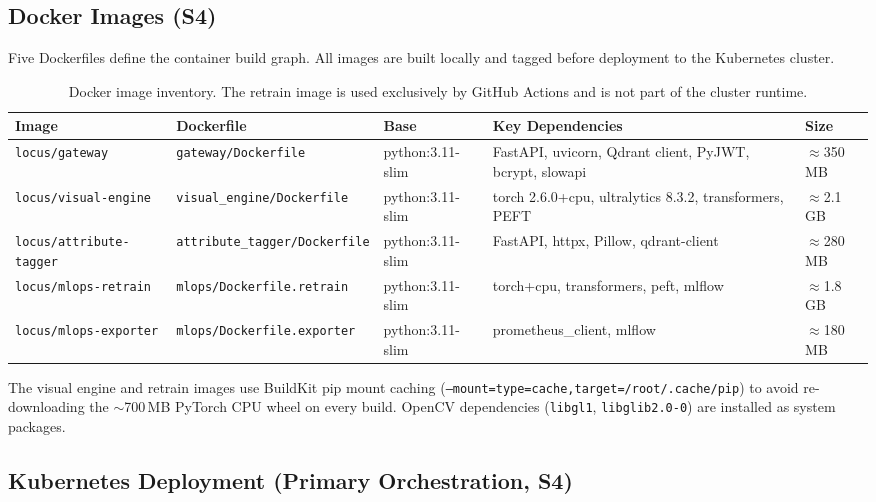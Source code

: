 \documentclass[12pt]{article}
\begin{document}
\subsection{Docker Images (S4)}

Five Dockerfiles define the container build graph. All images are built locally and tagged before deployment to the Kubernetes cluster.

\begin{table}[H]
\centering
\small
\begin{tabular}{@{}lllll@{}}
\toprule
\textbf{Image} & \textbf{Dockerfile} & \textbf{Base} & \textbf{Key Dependencies} & \textbf{Size} \\ \midrule
\texttt{locus/gateway}          & \texttt{gateway/Dockerfile}          & python:3.11-slim & FastAPI, uvicorn, Qdrant client, PyJWT, bcrypt, slowapi & $\approx$350\,MB \\
\texttt{locus/visual-engine}    & \texttt{visual\_engine/Dockerfile}   & python:3.11-slim & torch 2.6.0+cpu, ultralytics 8.3.2, transformers, PEFT & $\approx$2.1\,GB \\
\texttt{locus/attribute-tagger} & \texttt{attribute\_tagger/Dockerfile} & python:3.11-slim & FastAPI, httpx, Pillow, qdrant-client & $\approx$280\,MB \\
\texttt{locus/mlops-retrain}    & \texttt{mlops/Dockerfile.retrain}    & python:3.11-slim & torch+cpu, transformers, peft, mlflow & $\approx$1.8\,GB \\
\texttt{locus/mlops-exporter}   & \texttt{mlops/Dockerfile.exporter}   & python:3.11-slim & prometheus\_client, mlflow & $\approx$180\,MB \\ \bottomrule
\end{tabular}
\caption{Docker image inventory. The retrain image is used exclusively by GitHub Actions and is not part of the cluster runtime.}
\label{tab:images}
\end{table}

\noindent The visual engine and retrain images use BuildKit pip mount caching (\texttt{--mount=type=cache,target=/root/.cache/pip}) to avoid re-downloading the $\sim$700\,MB PyTorch CPU wheel on every build. OpenCV dependencies (\texttt{libgl1}, \texttt{libglib2.0-0}) are installed as system packages.

\subsection{Kubernetes Deployment (Primary Orchestration, S4)}
\end{document}
